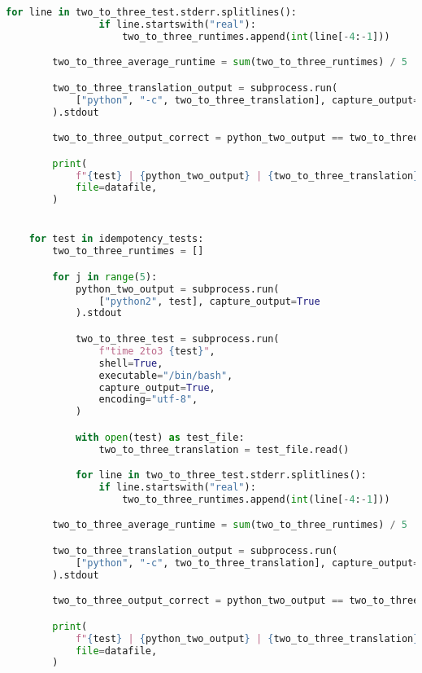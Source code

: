 \begin{lstlisting}[language=Python]
            for line in two_to_three_test.stderr.splitlines():
                if line.startswith("real"):
                    two_to_three_runtimes.append(int(line[-4:-1]))

        two_to_three_average_runtime = sum(two_to_three_runtimes) / 5

        two_to_three_translation_output = subprocess.run(
            ["python", "-c", two_to_three_translation], capture_output=True
        ).stdout

        two_to_three_output_correct = python_two_output == two_to_three_translation_output

        print(
            f"{test} | {python_two_output} | {two_to_three_translation} | {two_to_three_translation_output} | {two_to_three_output_correct} | {two_to_three_runtimes[0]} | {two_to_three_runtimes[1]} | {two_to_three_runtimes[2]} | {two_to_three_runtimes[3]} | {two_to_three_runtimes[4]} | {two_to_three_average_runtime}",
            file=datafile,
        )


    for test in idempotency_tests:
        two_to_three_runtimes = []

        for j in range(5):
            python_two_output = subprocess.run(
                ["python2", test], capture_output=True
            ).stdout

            two_to_three_test = subprocess.run(
                f"time 2to3 {test}",
                shell=True,
                executable="/bin/bash",
                capture_output=True,
                encoding="utf-8",
            )

            with open(test) as test_file:
                two_to_three_translation = test_file.read()

            for line in two_to_three_test.stderr.splitlines():
                if line.startswith("real"):
                    two_to_three_runtimes.append(int(line[-4:-1]))

        two_to_three_average_runtime = sum(two_to_three_runtimes) / 5

        two_to_three_translation_output = subprocess.run(
            ["python", "-c", two_to_three_translation], capture_output=True
        ).stdout

        two_to_three_output_correct = python_two_output == two_to_three_translation_output

        print(
            f"{test} | {python_two_output} | {two_to_three_translation} | {two_to_three_translation_output} | {two_to_three_output_correct} | {two_to_three_runtimes[0]} | {two_to_three_runtimes[1]} | {two_to_three_runtimes[2]} | {two_to_three_runtimes[3]} | {two_to_three_runtimes[4]} | {two_to_three_average_runtime}",
            file=datafile,
        )


\end{lstlisting}

